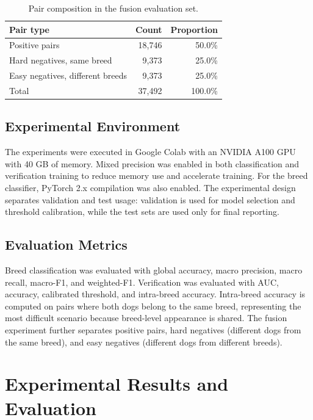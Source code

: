\documentclass[conference]{IEEEtran}
\begin{document}
\begin{table}[t]
\centering
\caption{Pair composition in the fusion evaluation set.}
\label{tab:fusion_pairs}
\begin{tabular}{lrr}
\toprule
Pair type & Count & Proportion \\
\midrule
Positive pairs & 18,746 & 50.0\% \\
Hard negatives, same breed & 9,373 & 25.0\% \\
Easy negatives, different breeds & 9,373 & 25.0\% \\
\midrule
Total & 37,492 & 100.0\% \\
\bottomrule
\end{tabular}
\end{table}

\subsection{Experimental Environment}

The experiments were executed in Google Colab with an NVIDIA A100 GPU with 40 GB of memory. Mixed precision was enabled in both classification and verification training to reduce memory use and accelerate training. For the breed classifier, PyTorch 2.x compilation was also enabled. The experimental design separates validation and test usage: validation is used for model selection and threshold calibration, while the test sets are used only for final reporting.

\subsection{Evaluation Metrics}

Breed classification was evaluated with global accuracy, macro precision, macro recall, macro-F1, and weighted-F1. Verification was evaluated with AUC, accuracy, calibrated threshold, and intra-breed accuracy. Intra-breed accuracy is computed on pairs where both dogs belong to the same breed, representing the most difficult scenario because breed-level appearance is shared. The fusion experiment further separates positive pairs, hard negatives (different dogs from the same breed), and easy negatives (different dogs from different breeds).

\section{Experimental Results and Evaluation}
\end{document}
